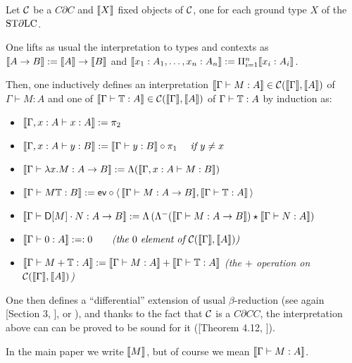 \begin{definition}
Let $\mathcal{C}$ be a $C\partial C$ and $\llbracket X\rrbracket$ fixed objects of $\mathcal{C}$, one for each ground type $X$ of the $\mathrm{ST}\partial\mathrm{LC}$.

One lifts as usual the interpretation to types and contexts as $\llbracket A\to B\rrbracket:=\llbracket A\rrbracket\to \llbracket B\rrbracket$ and $\llbracket x_1:A_1,\dots,x_n:A_n\rrbracket:=\Pi_{i=1}^n\llbracket x_i:A_i\rrbracket$.

Then, one inductively defines an interpretation $\llbracket\Gamma \vdash M:A\rrbracket\in\mathcal{C}(\llbracket\Gamma\rrbracket,\llbracket A\rrbracket)$ of $\Gamma \vdash M:A$ and one of $\llbracket\Gamma \vdash \mathbb{T}:A\rrbracket\in\mathcal{C}(\llbracket\Gamma\rrbracket,\llbracket A\rrbracket)$ of $\Gamma \vdash \mathbb{T}:A$ by induction as:
\begin{itemize}
 \item $\llbracket\Gamma, x:A \vdash x:A\rrbracket:=\pi_2$
 \item $\llbracket\Gamma, x:A \vdash y:B\rrbracket:=\llbracket\Gamma \vdash y:B\rrbracket\circ \pi_1\quad\textit{ if } y\neq x$
 \item $\llbracket\Gamma\vdash \lambda x.M:A\to B\rrbracket:=\Lambda(\llbracket\Gamma,x:A\vdash M:B\rrbracket)$
 \item $\llbracket\Gamma \vdash M\mathbb{T}:B\rrbracket:=\mathsf{ev} \circ \langle \, \llbracket\Gamma \vdash M:A\to B\rrbracket, \llbracket\Gamma \vdash \mathbb{T}:A\rrbracket \, \rangle$
 \item $\llbracket\Gamma \vdash \mathsf{D} [M] \cdot N:A\to B\rrbracket:=\Lambda\left(\Lambda^-(\llbracket\Gamma \vdash M:A\to B\rrbracket)\star \llbracket\Gamma \vdash N:A\rrbracket\right)$
 \item $\llbracket\Gamma \vdash 0:A\rrbracket:=:0 \qquad \textit{(the $0$ element of $\mathcal{C}(\llbracket\Gamma\rrbracket,\llbracket A\rrbracket)$)}$
 \item $\llbracket\Gamma \vdash M+\mathbb{T}:A\rrbracket:=\llbracket\Gamma \vdash M:A\rrbracket+\llbracket\Gamma \vdash \mathbb{T}:A\rrbracket$ \qquad \textit{(the $+$ operation on $\mathcal{C}(\llbracket\Gamma\rrbracket,\llbracket A\rrbracket)$)}
\end{itemize}
\end{definition}

One then defines a ``differential'' extension of usual $\beta$-reduction (see again [Section 3, \cite{Manzo2010}], or \cite{difflambda}), and thanks to the fact that $\mathcal{C}$ is a $C\partial CC$, the interpretation above can can be proved to be sound for it ([Theorem 4.12, \cite{Manzo2010}]).

In the main paper we write $\llbracket M\rrbracket$, but of course we mean $\llbracket\Gamma \vdash M:A\rrbracket$.







